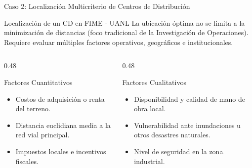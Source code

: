 \documentclass[aspectratio=169, 10pt]{beamer}
\begin{document}
\begin{frame}{Caso 2: Localización Multicriterio de Centros de Distribución}
    \begin{block}{Localización de un CD en FIME - UANL}
        La ubicación óptima no se limita a la minimización de distancias (foco tradicional de la Investigación de Operaciones). Requiere evaluar múltiples factores operativos, geográficos e institucionales.
    \end{block}
    \begin{columns}[T]
        \begin{column}{0.48\textwidth}
            \begin{block}{Factores Cuantitativos}
                \begin{itemize}
                    \item Costos de adquisición o renta del terreno.
                    \item Distancia euclidiana media a la red vial principal.
                    \item Impuestos locales e incentivos fiscales.
                \end{itemize}
            \end{block}
        \end{column}
        
        \begin{column}{0.48\textwidth}
            \begin{exampleblock}{Factores Cualitativos}
                \begin{itemize}
                    \item Disponibilidad y calidad de mano de obra local.
                    \item Vulnerabilidad ante inundaciones u otros desastres naturales.
                    \item Nivel de seguridad en la zona industrial.
                \end{itemize}
            \end{exampleblock}
        \end{column}
    \end{columns}
\end{frame}
\end{document}
